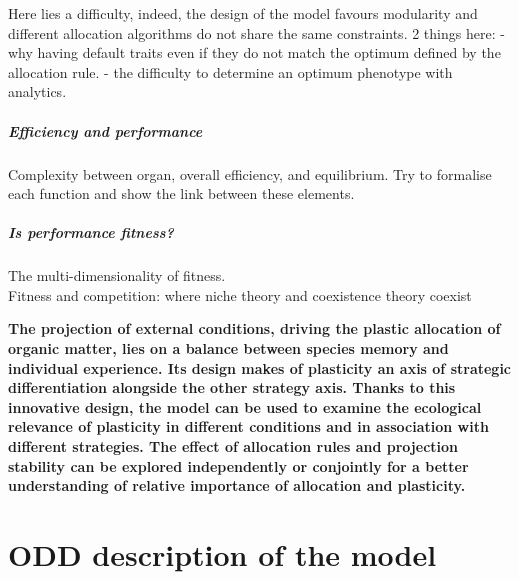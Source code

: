 Here lies a difficulty, indeed, the design of the model favours modularity and different allocation algorithms do not share the same constraints.
2 things here:
- why having default traits even if they do not match the optimum defined by the allocation rule.
- the difficulty to determine an optimum phenotype with analytics.

\paragraph{Efficiency and performance}
Complexity between organ, overall efficiency, and equilibrium. Try to formalise each function and show the link between these elements.

\paragraph{Is performance fitness?}

The multi-dimensionality of fitness.\\

Fitness and competition: where niche theory and coexistence theory coexist \parencite{letten_linking_2017}

 
 
\textbf{The projection of external conditions, driving the plastic allocation of organic matter, lies on a balance between species memory and individual experience. Its design makes of plasticity an axis of strategic differentiation alongside the other strategy axis. Thanks to this innovative design, the model can be used to examine the ecological relevance of plasticity in different conditions and in association with different strategies. The effect of allocation rules and projection stability can be explored independently or conjointly for a better understanding of relative importance of allocation and plasticity.}




\chapter{ODD description of the model \model}\label{chapter:model-description}




